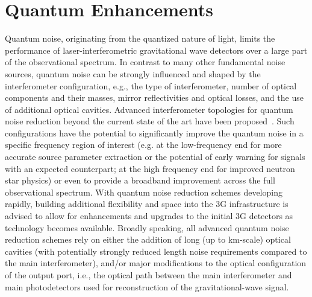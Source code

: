 \chapter{Quantum Enhancements}
\label{sec:Quantum}

\vspace{1 cm}
Quantum noise, originating from the quantized nature of light, limits the performance of laser-interferometric gravitational wave detectors over a large part of the observational spectrum. In contrast to many other fundamental noise sources, quantum noise can be strongly influenced and shaped by the interferometer configuration, e.g., the type of interferometer, number of optical components and their masses, mirror reflectivities and optical losses, and the use of additional optical cavities. Advanced interferometer topologies for quantum noise reduction beyond the current state of the art have been proposed~\cite{Danilishin:2019dxq}. Such configurations have the potential to significantly improve the quantum noise in a specific frequency region of interest (e.g. at the low-frequency end for more accurate source parameter extraction or the potential of early warning for signals with an expected counterpart; at the high frequency end for improved neutron star physics) or even to provide a broadband improvement across the full observational spectrum. 
With quantum noise reduction schemes developing rapidly, building additional flexibility and space into the 3G infrastructure is advised to allow for enhancements and upgrades to the initial 3G detectors as technology becomes available. 
Broadly speaking, all advanced quantum noise reduction schemes rely on either the addition of long (up to km-scale) optical cavities (with potentially strongly reduced length noise requirements compared to the main interferometer), and/or major modifications to the optical configuration of the output port, i.e., the optical path between the main interferometer and main photodetectors used for reconstruction of the gravitational-wave signal. 
